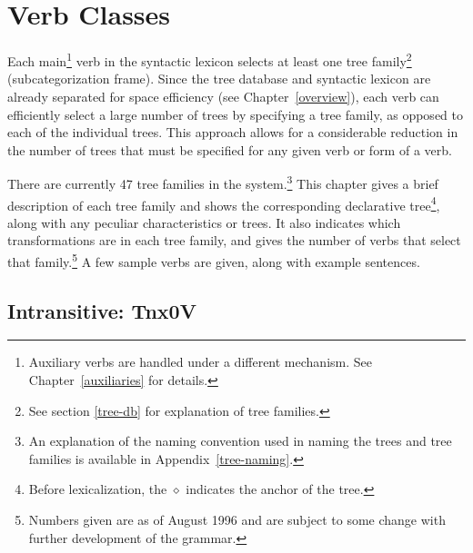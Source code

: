 
\chapter{Verb Classes}
\label{verb-classes}

Each main\footnote{Auxiliary verbs are handled under a different mechanism.
See Chapter~\ref{auxiliaries} for details.} verb in the syntactic lexicon
selects at least one tree family\footnote{See section \ref{tree-db} for
explanation of tree families.} (subcategorization frame).  Since the tree
database and syntactic lexicon are already separated for space efficiency (see
Chapter~\ref{overview}), each verb can efficiently select a large number of
trees by specifying a tree family, as opposed to each of the individual trees.
This approach allows for a considerable reduction in the number of trees that
must be specified for any given verb or form of a verb.

There are currently 47 tree families in the system.\footnote{An explanation of
the naming convention used in naming the trees and tree families is available
in Appendix~\ref{tree-naming}.}  This chapter gives a brief description of each
tree family and shows the corresponding declarative tree\footnote{Before
lexicalization, the $\diamond$ indicates the anchor of the tree.}, along with
any peculiar characteristics or trees.  It also indicates which transformations
are in each tree family, and gives the number of verbs that select that
family.\footnote{Numbers given are as of August 1996 and are subject to some
change with further development of the grammar.} A few sample verbs are given,
along with example sentences.


\section{Intransitive: Tnx0V}
\label{nx0V-family}

